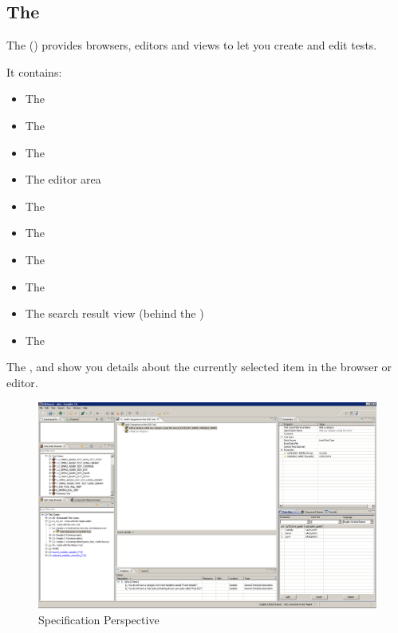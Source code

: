 \subsection{The \specpersp{}}
The \specpersp{} () provides browsers, editors and views to let you create and edit tests.

It contains:

\begin{itemize}
\item The \gdtestsuitebrowser{} 
\item The \gdtestcasebrowser{} 
\item The \gdcompnamebrowser{} 
\item The editor area 
\item The \gdpropview{} 
\item The \gddatasetsview{} 
\item The \gdcompnamesview{} 
\item The \gdprobview{} 
\item The search result view (behind the \gdprobview{})
\item The \gdrunautview{}
\end{itemize}

The \gdcompnamesview{}, \gddatasetsview{} and \gdpropview{} show you details about the currently selected item in the browser or editor. 

\begin{figure}
\includegraphics[width=12.5cm]{Userinterface/Editors/PS/client}
\caption{Specification Perspective}
\label{clientwindow}
\end{figure}


